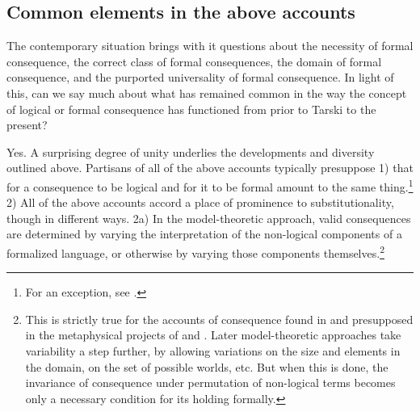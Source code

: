 	\subsection{Common elements in the above accounts}
	The contemporary situation brings with it questions about the necessity of formal consequence, the correct class of formal consequences, the domain of formal consequence, and the purported universality of formal consequence. In light of this, can we say much about what has remained common in the way the concept of logical or formal consequence has functioned from prior to Tarski to the present?
	
	Yes. A surprising degree of unity underlies the developments and diversity outlined above. Partisans of all of the above accounts typically presuppose 1) that for a consequence to be logical and for it to be formal amount to the same thing.\footnote{For an exception, see \cite{Read1994}.} 2) All of the above accounts accord a place of prominence to substitutionality, though in different ways. 2a) In the model-theoretic approach, valid consequences are determined by varying the interpretation of the non-logical components of a formalized language, or otherwise by varying those components themselves.\footnote{This is strictly true for the accounts of consequence found in \cite{Tarski2002} and presupposed in the metaphysical projects of \cite{Quine1948} and \cite{Lewis1968}. Later model-theoretic approaches take variability a step further, by allowing variations on the size and elements in the domain, on the set of possible worlds, etc. But when this is done, the invariance of consequence under permutation of non-logical terms becomes only a necessary condition for its holding formally.
		
}
